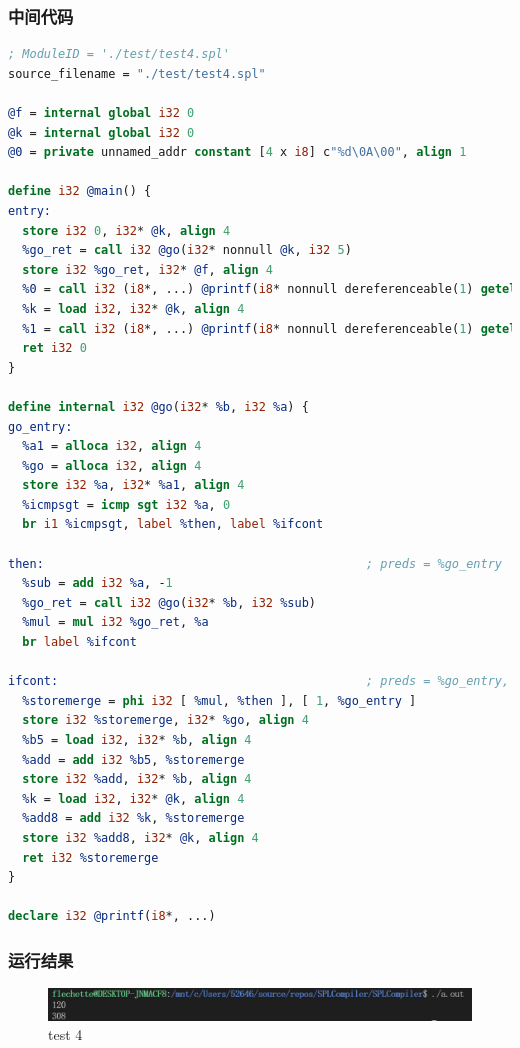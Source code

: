 \documentclass{article}
\begin{document}
\subsubsection{中间代码}
\begin{lstlisting}[language=LLVM]
; ModuleID = './test/test4.spl'
source_filename = "./test/test4.spl"

@f = internal global i32 0
@k = internal global i32 0
@0 = private unnamed_addr constant [4 x i8] c"%d\0A\00", align 1

define i32 @main() {
entry:
  store i32 0, i32* @k, align 4
  %go_ret = call i32 @go(i32* nonnull @k, i32 5)
  store i32 %go_ret, i32* @f, align 4
  %0 = call i32 (i8*, ...) @printf(i8* nonnull dereferenceable(1) getelementptr inbounds ([4 x i8], [4 x i8]* @0, i64 0, i64 0), i32 %go_ret)
  %k = load i32, i32* @k, align 4
  %1 = call i32 (i8*, ...) @printf(i8* nonnull dereferenceable(1) getelementptr inbounds ([4 x i8], [4 x i8]* @0, i64 0, i64 0), i32 %k)
  ret i32 0
}

define internal i32 @go(i32* %b, i32 %a) {
go_entry:
  %a1 = alloca i32, align 4
  %go = alloca i32, align 4
  store i32 %a, i32* %a1, align 4
  %icmpsgt = icmp sgt i32 %a, 0
  br i1 %icmpsgt, label %then, label %ifcont

then:                                             ; preds = %go_entry
  %sub = add i32 %a, -1
  %go_ret = call i32 @go(i32* %b, i32 %sub)
  %mul = mul i32 %go_ret, %a
  br label %ifcont

ifcont:                                           ; preds = %go_entry, %then
  %storemerge = phi i32 [ %mul, %then ], [ 1, %go_entry ]
  store i32 %storemerge, i32* %go, align 4
  %b5 = load i32, i32* %b, align 4
  %add = add i32 %b5, %storemerge
  store i32 %add, i32* %b, align 4
  %k = load i32, i32* @k, align 4
  %add8 = add i32 %k, %storemerge
  store i32 %add8, i32* @k, align 4
  ret i32 %storemerge
}

declare i32 @printf(i8*, ...)
\end{lstlisting}

\subsubsection{运行结果}
\begin{figure}[H]
    \centering
    \includegraphics[width=1\textwidth]{test4res.png}
    \caption{test 4}
\end{figure}
\end{document}
